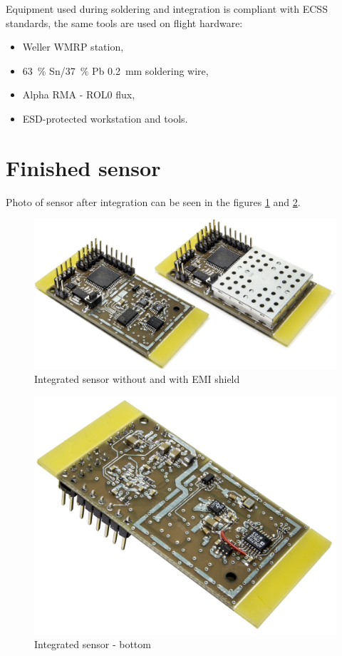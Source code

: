     Equipment used during soldering and integration is compliant with ECSS standards, the same tools are used on flight hardware:
    \begin{itemize}
        \item Weller WMRP station,
        \item \SI{63}{\percent} Sn/\SI{37}{\percent} Pb \SI{0.2}{\milli\meter} soldering wire,
        \item Alpha RMA - ROL0 flux,
        \item ESD-protected workstation and tools.
    \end{itemize}

\newpage
\section{Finished sensor}
    Photo of sensor after integration can be seen in the figures \ref{Integrated_sensor} and \ref{Integrated_sensor_bottom}.

    \begin{figure}[H]
        \centering
        \includegraphics[width=0.8\paperwidth]{img/06/finishiedSensorPhoto.jpg}
        \caption{Integrated sensor without and with EMI shield}
        \label{Integrated_sensor}
    \end{figure}

    \begin{figure}[H]
        \centering
        \includegraphics[width=0.6\paperwidth]{img/06/finishiedSensorPhotoBottom.jpg}
        \caption{Integrated sensor - bottom}
        \label{Integrated_sensor_bottom}
    \end{figure}
